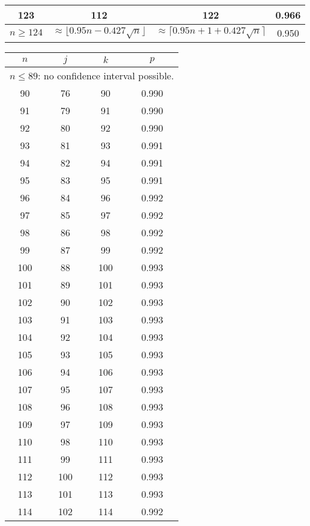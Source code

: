 \begin{table}
\begin{tabular}{|c|c|c|c|}
 123  & 112  & 122 & 0.966  \\ \hline
\hline $n \geq 124$ &
\multicolumn{1}{p{15mm}|}{$\approx \lfloor 0.95 n - 0.427 \sqrt{n}\rfloor$} &
\multicolumn{1}{p{15mm}|}{$\approx \lceil 0.95 n + 1 + 0.427 \sqrt{n}\rceil$} &
0.950 \\ \hline
\end{tabular}
 \hspace{2mm}
\hspace{2mm}
 \begin{tabular}{|c|c|c|c|}
 \hline $n$ & $j$ & $k$ & $p$ \\ \hline \hline
\multicolumn{4}{|c|}{
$n \leq 89 $: no confidence interval possible.}\\ \hline
 90  & 76  & 90 & 0.990  \\ \hline
 91  & 79  & 91 & 0.990  \\ \hline
 92  & 80  & 92 & 0.990  \\ \hline
 93  & 81  & 93 & 0.991  \\ \hline
 94  & 82  & 94 & 0.991  \\ \hline
 95  & 83  & 95 & 0.991  \\ \hline
 96  & 84  & 96 & 0.992  \\ \hline
 97  & 85  & 97 & 0.992  \\ \hline
 98  & 86  & 98 & 0.992  \\ \hline
 99  & 87  & 99 & 0.992  \\ \hline
 100  & 88  & 100 & 0.993  \\ \hline
 101  & 89  & 101 & 0.993  \\ \hline
 102  & 90  & 102 & 0.993  \\ \hline
 103  & 91  & 103 & 0.993  \\ \hline
 104  & 92  & 104 & 0.993  \\ \hline
 105  & 93  & 105 & 0.993  \\ \hline
 106  & 94  & 106 & 0.993  \\ \hline
 107  & 95  & 107 & 0.993  \\ \hline
 108  & 96  & 108 & 0.993  \\ \hline
 109  & 97  & 109 & 0.993  \\ \hline
 110  & 98  & 110 & 0.993  \\ \hline
 111  & 99  & 111 & 0.993  \\ \hline
 112  & 100  & 112 & 0.993  \\ \hline
 113  & 101  & 113 & 0.993  \\ \hline
 114  & 102  & 114 & 0.992  \\ \hline

\end{tabular}
\end{table}

